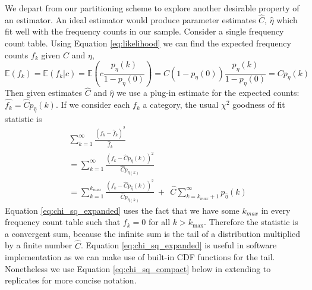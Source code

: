 \documentclass[oupdraft]{bio}
\newcommand{\kmax}{k_{\text{max}}}
\begin{document}
We depart from our partitioning scheme to explore another desirable property of an estimator.  An ideal estimator would produce parameter estimates $\widehat{C}$, $\widehat{\eta}$ which fit well with the frequency counts in our sample.  Consider a single frequency count table.  Using Equation \eqref{eq:likelihood} we can find the expected frequency counts $f_k$ given $C$ and $\eta$,
\begin{equation}
 \mathbb{E}\left(f_k\right) = \mathbb{E}\left(f_k|c \right) = \mathbb{E}\left( c \frac{p_{\eta}(k)}{1-p_{\eta}(0)} \right) = C\left(1-p_{\eta}(0) \right) \frac{p_{\eta}(k)}{1-p_{\eta}(0)} = Cp_{\eta}(k)
\end{equation}
Then given estimates $\widehat{C}$ and $\widehat{\eta}$ we use a plug-in estimate for the expected counts: $\widehat{f_k} = \widehat{C}p_{\widehat{\eta}}(k)$.  If we consider each $f_k$ a category, the usual $\chi^2$ goodness of fit statistic is
\begin{align}
&\sum_{k=1}^{\infty} \frac{\left(f_k - \widehat{f}_k \right)^2 }{\widehat{f}_k} \\
&=\sum_{k=1}^{\infty} \frac{\left(f_k - \widehat{C}p_{\widehat{\eta}}(k) \right)^2 }{\widehat{C} p_{\widehat{\eta}(k)}}  \label{eq:chi_sq_compact} \\
& = \sum_{k=1}^{k_{max}} \frac{\left(f_k - \widehat{C}p_{\widehat{\eta}}(k) \right)^2 }{\widehat{C} p_{\widehat{\eta}(k)}} \ + \ \ \widehat{C} \sum_{k = k_{max}+1}^{\infty} p_{\widehat{\eta}}(k) \label{eq:chi_sq_expanded}
\end{align}
Equation \eqref{eq:chi_sq_expanded} uses the fact that we have some $k_{max}$ in every frequency count table such that $f_k = 0$ for all $k > \kmax$.  Therefore the statistic is a convergent sum, because the infinite sum is the tail of a distribution multiplied by a finite number $\widehat{C}$.  Equation \eqref{eq:chi_sq_expanded} is useful in software implementation as we can make use of built-in CDF functions for the tail.  Nonetheless we use Equation \eqref{eq:chi_sq_compact} below in extending to replicates for more concise notation.
\end{document}
